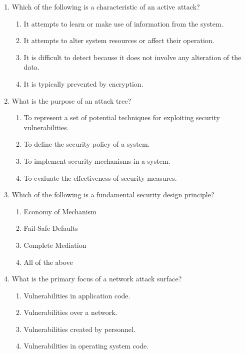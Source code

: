 \documentclass{article}
\begin{document}
\begin{enumerate}
    \item Which of the following is a characteristic of an active attack?
    \begin{enumerate}
        \item It attempts to learn or make use of information from the system.
        \item It attempts to alter system resources or affect their operation.
        \item It is difficult to detect because it does not involve any alteration of the data.
        \item It is typically prevented by encryption.
    \end{enumerate}
    \newpage
    \item What is the purpose of an attack tree?
    \begin{enumerate}
        \item To represent a set of potential techniques for exploiting security vulnerabilities.
        \item To define the security policy of a system.
        \item To implement security mechanisms in a system.
        \item To evaluate the effectiveness of security measures.
    \end{enumerate}
    
    \item Which of the following is a fundamental security design principle?
    \begin{enumerate}
        \item Economy of Mechanism
        \item Fail-Safe Defaults
        \item Complete Mediation
        \item All of the above
    \end{enumerate}
    
    \item What is the primary focus of a network attack surface?
    \begin{enumerate}
        \item Vulnerabilities in application code.
        \item Vulnerabilities over a network.
        \item Vulnerabilities created by personnel.
        \item Vulnerabilities in operating system code.
    \end{enumerate}
    

\end{enumerate}
\end{document}
